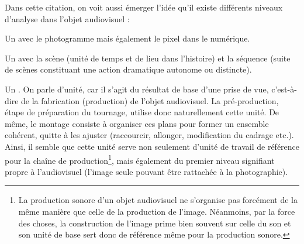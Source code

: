 Dans cette citation, on voit aussi émerger l'idée qu'il existe différents niveaux d'analyse dans l'objet audiovisuel : 
\begin{liste}
	\item Un  avec le photogramme mais également le pixel dans le numérique.
	\item Un  avec la scène (unité de temps et de lieu dans l'histoire) et la séquence (suite de scènes constituant une action dramatique autonome ou distincte).
	\item Un . 
	On parle d'unité, car il s'agit du résultat de base d'une prise de vue, c'est-à-dire de la fabrication (production) de l'objet audiovisuel. 
	La pré-production, étape de préparation du tournage, utilise donc naturellement cette unité. 
	De même, le montage consiste à organiser ces plans pour former un ensemble cohérent, quitte à les ajuster (raccourcir, allonger, modification du cadrage etc.). 
	Ainsi, il semble que cette unité serve non seulement d'unité de travail de référence pour la chaîne de production\footnote{La production sonore d'un objet audiovisuel ne s'organise pas forcément de la même manière que celle de la production de l'image. Néanmoins, par la force des choses, la construction de l'image prime bien souvent sur celle du son et son unité de base sert donc de référence même pour la production sonore.}, mais également du premier niveau signifiant propre à l'audiovisuel (l'image seule pouvant être rattachée à la photographie).
\end{liste}


